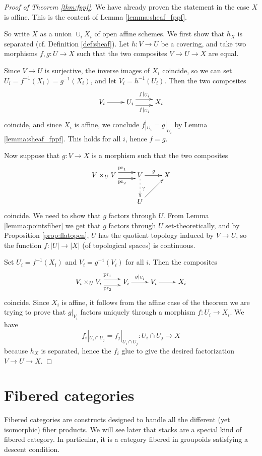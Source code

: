 \documentclass[11pt, english]{article}
\begin{document}
\begin{proof}[Proof of Theorem \ref{thm:fppf}]
We have already proven the statement in the case $X$ is affine.  This is the content of Lemma \ref{lemma:sheaf_fppf}.

So write $X$ as a union $\cup_i X_i$ of open affine schemes. We first show that $h_X$ is separated (cf. Definition \ref{def:sheaf}). Let $h:V \to U$ be a covering, and take two morphisms $f,g:U \to X$ such that the two composites $V \to U \to X$ are equal.

Since $V \to U$ is surjective, the inverse images of $X_i$ coincide, so we can set $U_i=f^{-1}(X_i)=g^{-1}(X_i)$, and let $V_i=h^{-1}(U_i)$. Then the two composites
\[
\xymatrix{
V_i \ar[r] & U_i \ar@<1ex>[r]^{f|_{U_i}} \ar@<-1ex>[r]_{f|_{U_i}} & X_i
}
\]
coincide, and since $X_i$ is affine, we conclude $f|_{U_i} = g|_{U_i}$ by Lemma \ref{lemma:sheaf_fppf}. This holds for all $i$, hence $f=g$. 

Now suppose that $g:V \to X$ is a morphism such that the two composites 
\[
\xymatrix{
V \times_U V   \ar@<1ex>[r]^{\pr_1} \ar@<-1ex>[r]_{\pr_2} &  V \ar[r]^g \ar@{.>}[d]^? & X \\
  & U \ar[ur] 
}
\]
coincide. We need to show that $g$ factors through $U$. From Lemma \ref{lemma:pointsfiber} we get that $g$ factors through $U$ set-theoretically, and by Proposition \ref{prop:flatopen}, $U$ has the quotient topology induced by $V \to U$, so the function $f:|U| \to |X|$ (of topological spaces) is continuous.

Set $U_i = f^{-1}(X_i)$ and $V_i = g^{-1}(V_i)$ for all $i$. Then the composites
\[
\xymatrix{
V_i \times_U V_i \ar@<1ex>[r]^{\pr_1} \ar@<-1ex>[r]_{\pr_2} & V_i \ar[r]^{g|_{V_i}} & V_i \ar[r] & X_i
} 
\] 
coincide. Since $X_i$ is affine, it follows from the affine case of the theorem we are trying to prove that $g|_{V_i}$ factors uniquely through a morphism $f:U_i \to X_i$. We have
\[
f_i|_{U_i \cap U_j} = f_j|_{U_i \cap U_j} : U_i \cap U_j \to X
\]
because $h_X$ is separated, hence the $f_i$ glue to give the desired factorization $V \to U \to X$.
\end{proof}

\pagebreak
\section{Fibered categories}
\label{sec:fibered}

Fibered categories are constructs designed to handle all the different (yet isomorphic) fiber products. We will see later that stacks are a special kind of fibered category. In particular, it is a category fibered in groupoids satisfying a descent condition.
\end{document}
